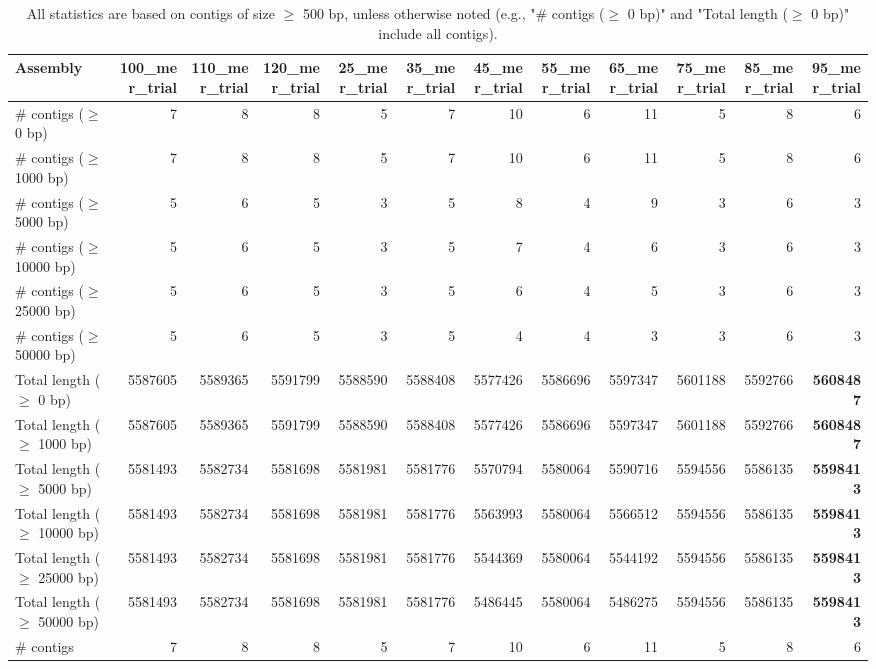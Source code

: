 \documentclass[12pt,a4paper]{article}
\begin{document}
\begin{table}[ht]
\begin{center}
\caption{All statistics are based on contigs of size $\geq$ 500 bp, unless otherwise noted (e.g., "\# contigs ($\geq$ 0 bp)" and "Total length ($\geq$ 0 bp)" include all contigs).}
\begin{tabular}{|l*{11}{|r}|}
\hline
Assembly & 100\_mer\_trial & 110\_mer\_trial & 120\_mer\_trial & 25\_mer\_trial & 35\_mer\_trial & 45\_mer\_trial & 55\_mer\_trial & 65\_mer\_trial & 75\_mer\_trial & 85\_mer\_trial & 95\_mer\_trial \\ \hline
\# contigs ($\geq$ 0 bp) & 7 & 8 & 8 & 5 & 7 & 10 & 6 & 11 & 5 & 8 & 6 \\ \hline
\# contigs ($\geq$ 1000 bp) & 7 & 8 & 8 & 5 & 7 & 10 & 6 & 11 & 5 & 8 & 6 \\ \hline
\# contigs ($\geq$ 5000 bp) & 5 & 6 & 5 & 3 & 5 & 8 & 4 & 9 & 3 & 6 & 3 \\ \hline
\# contigs ($\geq$ 10000 bp) & 5 & 6 & 5 & 3 & 5 & 7 & 4 & 6 & 3 & 6 & 3 \\ \hline
\# contigs ($\geq$ 25000 bp) & 5 & 6 & 5 & 3 & 5 & 6 & 4 & 5 & 3 & 6 & 3 \\ \hline
\# contigs ($\geq$ 50000 bp) & 5 & 6 & 5 & 3 & 5 & 4 & 4 & 3 & 3 & 6 & 3 \\ \hline
Total length ($\geq$ 0 bp) & 5587605 & 5589365 & 5591799 & 5588590 & 5588408 & 5577426 & 5586696 & 5597347 & 5601188 & 5592766 & {\bf 5608487} \\ \hline
Total length ($\geq$ 1000 bp) & 5587605 & 5589365 & 5591799 & 5588590 & 5588408 & 5577426 & 5586696 & 5597347 & 5601188 & 5592766 & {\bf 5608487} \\ \hline
Total length ($\geq$ 5000 bp) & 5581493 & 5582734 & 5581698 & 5581981 & 5581776 & 5570794 & 5580064 & 5590716 & 5594556 & 5586135 & {\bf 5598413} \\ \hline
Total length ($\geq$ 10000 bp) & 5581493 & 5582734 & 5581698 & 5581981 & 5581776 & 5563993 & 5580064 & 5566512 & 5594556 & 5586135 & {\bf 5598413} \\ \hline
Total length ($\geq$ 25000 bp) & 5581493 & 5582734 & 5581698 & 5581981 & 5581776 & 5544369 & 5580064 & 5544192 & 5594556 & 5586135 & {\bf 5598413} \\ \hline
Total length ($\geq$ 50000 bp) & 5581493 & 5582734 & 5581698 & 5581981 & 5581776 & 5486445 & 5580064 & 5486275 & 5594556 & 5586135 & {\bf 5598413} \\ \hline
\# contigs & 7 & 8 & 8 & 5 & 7 & 10 & 6 & 11 & 5 & 8 & 6 \\ \hline

\end{tabular}
\end{center}
\end{table}
\end{document}
